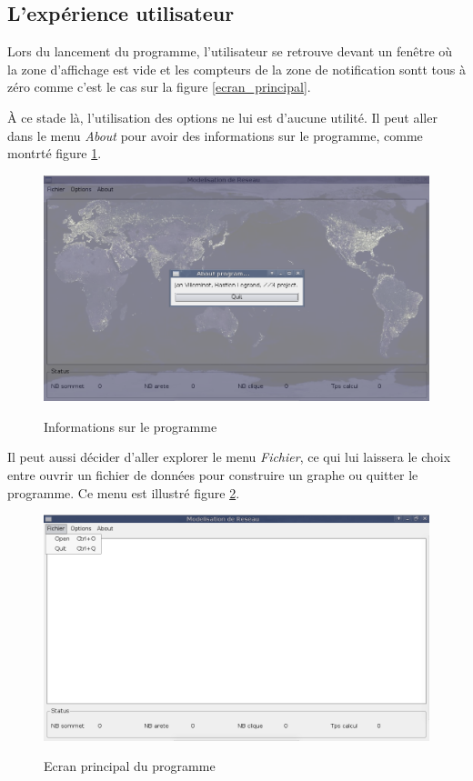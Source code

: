 \subsection{L'exp\'erience utilisateur}
\par
Lors du lancement du programme, l'utilisateur se retrouve devant un fen\^etre o\`u la zone d'affichage est vide et les compteurs de la zone de notification sontt tous \`a z\'ero comme c'est le cas sur la figure \ref{ecran_principal}.
\par
\`A ce stade l\`a, l'utilisation des options ne lui est d'aucune utilit\'e. Il peut aller dans le menu \textit{About} pour avoir des informations sur le programme, comme montrt\'e figure \ref{ecran_about}.

\begin{figure}[ht]
\centering
 \fbox
 {
 \includegraphics[width=16cm]{./schema/capture_ecran_about.png}
 }
  \caption{\label{ecran_about}Informations sur le programme}
\end{figure}

\par
Il peut aussi d\'ecider d'aller explorer le menu \textit{Fichier}, ce qui lui laissera le choix entre ouvrir un fichier de donn\'ees pour construire un graphe ou quitter le programme. Ce menu est illustr\'e figure \ref{ecran_fichier}.

\begin{figure}[ht]
\centering
 \fbox
 {
 \includegraphics[width=16cm]{./schema/capture_ecran_fichier.png}
 }
  \caption{\label{ecran_fichier}Ecran principal du programme}
\end{figure}

